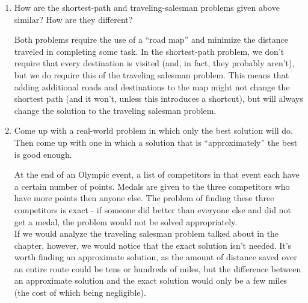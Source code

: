 \documentclass[Chapter01]{subfiles}
\begin{document}
\begin{enumerate}[leftmargin=\labelsep]
		\item How are the shortest-path and traveling-salesman problems given above similar? How are they different?
		\begin{answer}
			Both problems require the use of a ``road map'' and minimize the distance traveled in completing some task. In the shortest-path problem, we don't require that every destination is visited (and, in fact, they probably aren't), but we do require this of the traveling salesman problem. This means that adding additional roads and destinations to the map might not change the shortest path (and it won't, unless this introduces a shortcut), but will always change the solution to the traveling salesman problem.
		\end{answer}

		\item Come up with a real-world problem in which only the best solution will do. Then come up with one in which a solution that is ``approximately'' the best is good enough.
		\begin{answer}
			At the end of an Olympic event, a list of competitors in that event each have a certain number of points. Medals are given to the three competitors who have more points then anyone else. The problem of finding these three competitors is exact - if someone did better than everyone else and did not get a medal, the problem would not be solved appropriately.\\

			If we would analyze the traveling salesman problem talked about in the chapter, however, we would notice that the exact solution isn't needed. It's worth finding an approximate solution, as the amount of distance saved over an entire route could be tens or hundreds of miles, but the difference between an approximate solution and the exact solution would only be a few miles (the cost of which being negligible).
		\end{answer}
	\end{enumerate}
\end{document}
